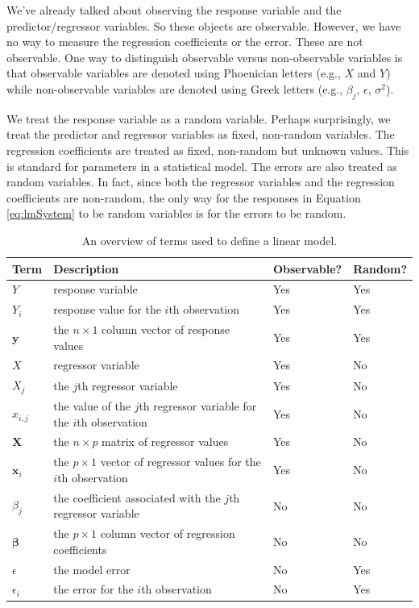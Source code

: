 \documentclass[
]{book}
\theoremstyle{definition}
\theoremstyle{definition}
\theoremstyle{definition}
\theoremstyle{definition}
\theoremstyle{remark}
\begin{document}
We've already talked about observing the response variable and the predictor/regressor variables. So these objects are observable. However, we have no way to measure the regression coefficients or the error. These are not observable. One way to distinguish observable versus non-observable variables is that observable variables are denoted using Phoenician letters (e.g., \(X\) and \(Y\)) while non-observable variables are denoted using Greek letters (e.g., \(\beta_j\), \(\epsilon\), \(\sigma^2\)).

We treat the response variable as a random variable. Perhaps surprisingly, we treat the predictor and regressor variables as fixed, non-random variables. The regression coefficients are treated as fixed, non-random but unknown values. This is standard for parameters in a statistical model. The errors are also treated as random variables. In fact, since both the regressor variables and the regression coefficients are non-random, the only way for the responses in Equation \eqref{eq:lmSystem} to be random variables is for the errors to be random.

\begin{table}

\caption{\label{tab:term-df}An overview of terms used to define a linear model.}
\centering
\begin{tabular}[t]{l>{\raggedright\arraybackslash}p{2in}ll}
\toprule
Term & Description & Observable? & Random?\\
\midrule
$Y$ & response variable & Yes & Yes\\
$Y_i$ & response value for the $i$th observation & Yes & Yes\\
$\mathbf{y}$ & the $n\times 1$ column vector of response values & Yes & Yes\\
$X$ & regressor variable & Yes & No\\
$X_j$ & the $j$th regressor variable & Yes & No\\
\addlinespace
$x_{i,j}$ & the value of the $j$th regressor variable for the $i$th observation & Yes & No\\
$\mathbf{X}$ & the $n\times p$ matrix of regressor values & Yes & No\\
$\mathbf{x}_i$ & the $p\times 1$ vector of regressor values for the $i$th observation & Yes & No\\
$\beta_j$ & the coefficient associated with the $j$th regressor variable & No & No\\
$\boldsymbol{\beta}$ & the $p\times 1$ column vector of regression coefficients & No & No\\
\addlinespace
$\epsilon$ & the model error & No & Yes\\
$\epsilon_i$ & the error for the $i$th observation & No & Yes\\
\bottomrule
\end{tabular}
\end{table}
\end{document}
